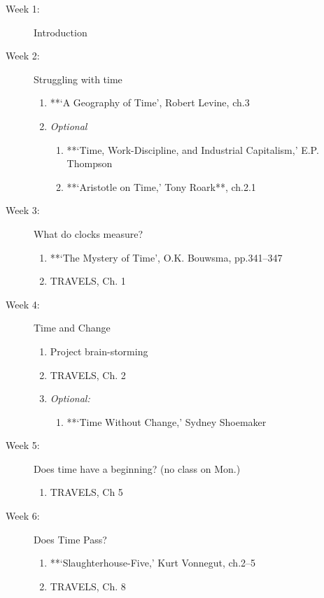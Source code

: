 \documentclass[article,oneside]{memoir}
\begin{document}
\begin{description}

\item[Week 1:] Introduction

\item[Week 2:]  Struggling with time
\begin{enumerate}
\item **`A Geography of Time', Robert Levine, ch.3
\item  \emph{Optional}
\begin{enumerate}
\item **`Time, Work-Discipline, and Industrial Capitalism,' E.P. Thompson
\item **`Aristotle on Time,' Tony Roark**, ch.2.1
\end{enumerate}
\end{enumerate}

\item[Week 3:] What do clocks measure? 
\begin{enumerate}
\item **`The Mystery of Time', O.K. Bouwsma, pp.341--347 
\item TRAVELS, Ch. 1
\end{enumerate}

\item[Week 4:] Time and Change
\begin{enumerate}
\item Project brain-storming
\item TRAVELS, Ch. 2
\item \emph{Optional:}
\begin{enumerate}
\item **`Time Without Change,' Sydney Shoemaker
\end{enumerate}
\end{enumerate}

\item[Week 5:] Does time have a beginning? (no class on Mon.)
\begin{enumerate}
\item TRAVELS, Ch 5
\end{enumerate}

\item[Week 6:] Does Time Pass? 
\begin{enumerate}
\item **`Slaughterhouse-Five,' Kurt Vonnegut, ch.2--5
\item TRAVELS, Ch. 8
\end{enumerate}


\end{description}
\end{document}
